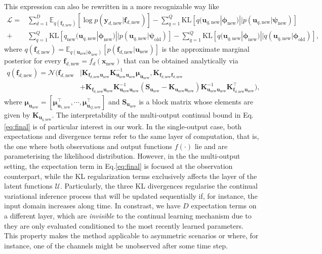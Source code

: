 \documentclass[]{article}
\def\K{{\mathbf K}}
\def\S{{\mathbf S}}
\def\u{{\mathbf u}}
\def\f{{\mathbf f}}
\newcommand{\qnew}{{q_{\text{new}}}}
\newcommand{\psiold}{{\bm{\psi}_{\text{old}}}}
\newcommand{\psinew}{{\bm{\psi}_{\text{new}}}}
\newcommand{\unew}{{\u_{\text{new}}}}
\newcommand{\Ucal}{\mathcal{U}}
\newcommand{\xc}{\bm{x}}
\newcommand{\yc}{\bm{y}}
\newcommand{\xcnew}{{\xc_{\text{new}}}}
\newcommand{\phiold}{{\bm{\phi}_{\text{old}}}}
\newcommand{\phinew}{{\bm{\phi}_{\text{new}}}}
\begin{document}
This expression can also be rewritten in a more recognizable way like
\begin{align}
\label{eq:final}
\mathcal{L} =& \sum_{d=1}^{D}\mathbb{E}_{q(\f_{d, \text{new}})}\left[\log p(\yc_{d, \text{new}}|\f_{d, \text{new}})\right] -\sum_{q=1}^{Q}\text{KL}\left[q(\u_{q,\text{new}}|\phinew)||p(\u_{q,\text{new}}|\psinew)\right] \nonumber\\
+& \sum_{q=1}^{Q} \text{KL} \left[\qnew(\u_{q,\text{new}}|\phinew)||p(\u_{q,\text{new}}|\psiold)\right] - \sum_{q=1}^{Q} \text{KL}\left[q(\u_{q,\text{new}}|\phinew)||q(\u_{q,\text{new}}|\phiold)\right],
\end{align}
where $q(\f_{d, \text{new}}) = \mathbb{E}_{q(\unew|\phinew)}[p(\f_{d, \text{new}}|\unew)]$ is the approximate marginal posterior for every $\f_{d, \text{new}} = f_d(\xcnew)$ that can be obtained analytically via
\begin{align*}
q(\f_{d, \text{new}}) =
\mathcal{N}(\f_{d, \text{new}}&|\mathbf{K}_{\f_{d, \text{new}}\unew}\mathbf{K}^{-1}_{\unew\unew}\bm{\mu}_{\unew},\K_{\f_{d, \text{new}}\f_{d, \text{new}}} \\&+ \mathbf{K}_{\f_{d, \text{new}}\unew}\mathbf{K}^{-1}_{\unew\unew}(\S_\unew -\K_{\unew\unew})\mathbf{K}^{-1}_{\unew\unew}\K_{\f_{d, \text{new}}\unew}^{\top}), 
\end{align*} 
where $\bm{\mu}_{\unew} = [\bm{\mu}^\top_{\u_{1,\text{new}}}, \cdots, \bm{\mu}^\top_{\u_{Q,\text{new}}}]$ and $\S_\unew$ is a block matrix whose elements are given by $\K_{\u_{q,\text{new}}}$. The interpretability of the multi-output continual bound in Eq. \eqref{eq:final} is of particular interest in our work. In the single-output case, both expectations and divergence terms refer to the same layer of computation, that is, the one where both observations and output functions $f(\cdot)$ lie and are parameterising the likelihood distribution. However, in the the multi-output setting, the expectation term in Eq.\eqref{eq:final} is focused at the observation counterpart, while the KL regularization terms exclusively affects the layer of the latent functions $\Ucal$. Particularly, the three KL divergences regularise the continual variational inference process that will be updated sequentially if, for instance, the input domain increases along time. In constrast,  we have $D$ expectation terms on a different layer, which are \textit{invisible} to the continual learning mechanism due to they are only evaluated conditioned to the most recently learned parameters. This property makes the method applicable to asymmetric scenarios or where, for instance, one of the channels might be unobserved after some time step.
\end{document}
